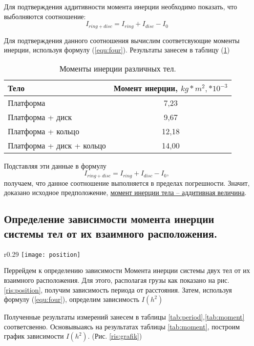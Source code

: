 \documentclass[12pt,a4paper]{article}
\begin{document}
		Для подтверждения аддитивности момента инерции необходимо показать, что выболняются соотношение:
		$$ I_{ring + disc} = I_{ring} + I_{disc} - I_{0} $$

		Для подтверждения данного соотношения вычислим соответсвующие моменты инерции, используя формулу (\ref{equ:four}). Результаты занесем в таблицу (\ref{tab:moments})

		\begin{table}[h!]
			\begin{center}
				\begin{tabular}{| l | c |}
				\hline
				Тело & Момент инерции, $kg*m^{2}, * 10^{-3}$ \\ \hline
				Платформа & 7,23 \\ \hline
				Платформа + диск & 9,67 \\ \hline
				Платформа + кольцо & 12,18 \\ \hline
				Платформа + диск + кольцо & 14,00 \\ \hline
				\end{tabular}
				\caption{Моменты инерции различных тел.}
				\label{tab:moments}
			\end{center}
		\end{table}

		Подставляя эти данные в формулу $$ I_{ring + disc} = I_{ring} + I_{disc} - I_{0}, $$ получаем, что данное соотношение выполняется в пределах погрешности. Значит, доказано исходное предположение, \underline{момент инерции тела -- аддитивная величина}.
		\newpage

	\subsection{Определение зависимости момента инерции системы тел от их взаимного расположения.}
		\begin{wrapfigure}[10]{r}{0.29\textwidth}
			\vspace{-3em}
			\texttt{[image: position]}
			\caption{Схема расположения грузов на платформе трифилярного подвеса.}
			\label{ris:position}
		\end{wrapfigure}

		Перрейдем к определению зависимости Момента инерции системы двух тел от их взаимного расположения. Для этого, располагая грузы как показано на рис. \ref{ris:position}, получим зависимость периода от расстояния. Затем, используя формулу (\ref{equ:four}), определим зависимость $ I(h^{2}) $

		Полученные результаты измерений занесем в таблицы \ref{tab:period},\ref{tab:moment} соответсвенно. Основывыаясь на результатах таблицы \ref{tab:moment}, построим график зависимости $ I(h^{2}) $. (Рис. \ref{ris:grafik})
\end{document}
